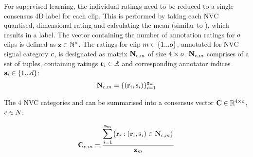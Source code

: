 For supervised learning, the individual ratings need to be reduced to a single consensus 4{D} label for each clip. This is performed by taking each \ac{NVC} quantised, dimensional rating and calculating the mean (similar to \cite{Tarasov2010, Wollmer2009}), which results in a \continuous label. The vector containing the number of annotation ratings for $o$ clips is defined as $\textbf{z} \in \mathbb{N}^{o}$. The ratings for clip $m \in \{1...o\}$, annotated for \ac{NVC} signal category $c$, is designated as matrix $\textbf{N}_{c,m}$ of size ${4 \times o}$. $\textbf{N}_{c,m}$ comprises of a set of tuples, containing ratings $\textbf{r}_i \in \mathbb{R}$ and corresponding annotator indices $\textbf{s}_i \in \{1...d\}$:
\begin{align}
\textbf{N}_{c,m} = \{(\textbf{r}_i, \textbf{s}_i)\}_{i=1}^{\textbf{z}_{m}}
\end{align}

The 4 \ac{NVC} categories and can be summarised into a consensus vector $\textbf{C} \in \mathbb{R}^{4 \times o}$, $c \in N$:

\begin{align}
\textbf{C}_{c, m} = \frac{\displaystyle\sum\limits_{i=1}^{\textbf{z}_{m}} \{\textbf{r}_i: (\textbf{r}_i, \textbf{s}_i) \in \textbf{N}_{c,m}\}}{\textbf{z}_{m}}
\end{align}



